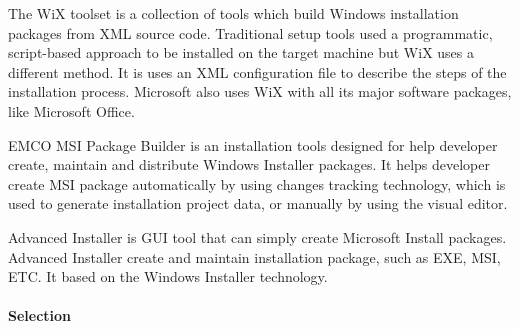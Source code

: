 
The WiX toolset is a collection of tools which build Windows installation packages from XML source code.
Traditional setup tools used a programmatic, script-based approach to be installed on the target machine but WiX uses a different method.
It is uses an XML configuration file to describe the steps of the installation process.
Microsoft also uses WiX with all its major software packages, like Microsoft Office.
\cite{Wix_tool}


EMCO MSI Package Builder is an installation tools designed for help developer create, maintain and distribute Windows Installer packages.
\cite{EMCO_MSI}
It helps developer create MSI package automatically by using changes tracking technology, which is used to generate installation project data, or manually by using the visual editor.


Advanced Installer is GUI tool that can simply create Microsoft Install packages.
Advanced Installer create and maintain installation package, such as EXE, MSI, ETC.
It based on the Windows Installer technology.
\cite{advanced_install}

\paragraph{Selection}

